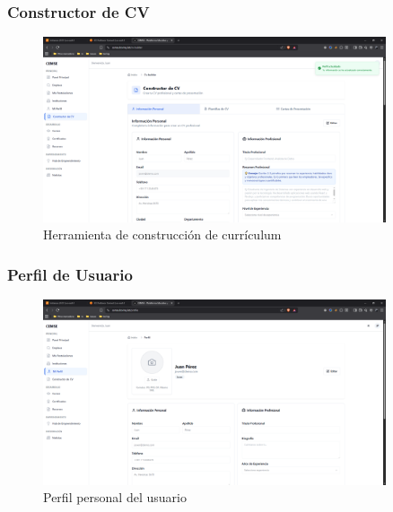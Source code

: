 \documentclass[12pt,a4paper]{article}
\begin{document}
\begin{enumerate}
\subsubsection{Constructor de CV}
\begin{figure}[H]
    \centering
    \includegraphics[width=0.9\textwidth]{screenshots/youth/cv-builder.png}
    \caption{Herramienta de construcción de currículum}
    \label{fig:youth-cv-builder}
\end{figure}

\subsubsection{Perfil de Usuario}
\begin{figure}[H]
    \centering
    \includegraphics[width=0.9\textwidth]{screenshots/youth/profile.png}
    \caption{Perfil personal del usuario}
    \label{fig:youth-profile}
\end{figure}


\end{enumerate}
\end{document}

